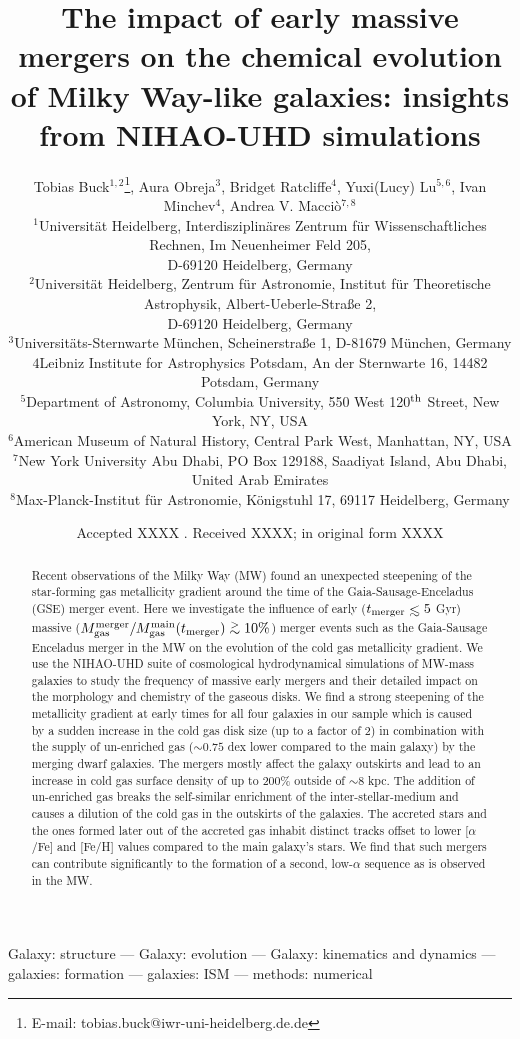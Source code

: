\documentclass[useAMS,usenatbib]{mnras}
\title[Early massive accretion events in MW-mass galaxies]{The impact of early massive mergers on the chemical evolution of Milky Way-like galaxies: insights from NIHAO-UHD simulations}
\author[T. Buck] {Tobias Buck$^{1,2}$\thanks{E-mail: tobias.buck@iwr-uni-heidelberg.de.de}, Aura Obreja$^{3}$, Bridget Ratcliffe$^{4}$, Yuxi(Lucy) Lu$^{5, 6}$, 
\newauthor Ivan Minchev$^{4}$, Andrea V. Macci\`o$^{7,8}$ \\  %
%
$^1$Universit\"at Heidelberg, Interdisziplin\"ares Zentrum f\"ur Wissenschaftliches Rechnen, Im Neuenheimer Feld 205, \\ D-69120 Heidelberg, Germany\\
$^2$Universit\"at Heidelberg, Zentrum f\"ur Astronomie, Institut f\"ur Theoretische Astrophysik, Albert-Ueberle-Straße 2, \\ D-69120 Heidelberg, Germany\\
$^3$Universit\"ats-Sternwarte M\"unchen, Scheinerstraße 1, D-81679 M\"unchen, Germany\\
${4}$Leibniz Institute for Astrophysics Potsdam, An der Sternwarte 16, 14482 Potsdam, Germany\\
$^{5}$Department of Astronomy, Columbia University, 550 West 120$^{\rm th}$ Street, New York, NY, USA\\
$^{6}$American Museum of Natural History, Central Park West, Manhattan, NY, USA\\
$^7$New York University Abu Dhabi, PO Box 129188, Saadiyat Island, Abu Dhabi, United Arab Emirates\\
$^8$Max-Planck-Institut f\"ur Astronomie, K\"onigstuhl 17, 69117 Heidelberg, Germany
}
\newcommand{\gtsima}{$\; \buildrel > \over \sim \;$}
\newcommand{\gsim}{\lower.5ex\hbox{\gtsima}}
\def\lesssim{\mathrel{\hbox{\rlap{\hbox{\lower4pt\hbox{$\sim$}}}\hbox{$<$}}}}
\begin{document}
\date{Accepted XXXX . Received XXXX; in original form XXXX}

\pagerange{\pageref{firstpage}--\pageref{lastpage}} 

\maketitle

\label{firstpage}


\begin{abstract}
Recent observations of the Milky Way (MW) found an unexpected steepening of the star-forming gas metallicity gradient around the time of the Gaia-Sausage-Enceladus (GSE) merger event.
Here we investigate the influence of early ($t_{\rm{merger}}\lesssim5$ Gyr) massive ($M_{\rm{gas}}^{\rm{merger}}/M_{\rm{gas}}^{\rm{main}}(t_{\rm{merger}})\gsim10\%$) merger events such as the Gaia-Sausage Enceladus merger in the MW on the evolution of the cold gas metallicity gradient. We use the NIHAO-UHD suite of cosmological hydrodynamical simulations of MW-mass galaxies to study the frequency of massive early mergers and their detailed impact on the morphology and chemistry of the gaseous disks. 
We find a strong steepening of the metallicity gradient at early times for all four galaxies in our sample which is caused by a sudden increase in the cold gas disk size (up to a factor of 2) in combination with the supply of un-enriched gas ($\sim0.75$ dex lower compared to the main galaxy) by the merging dwarf galaxies.
The mergers mostly affect the galaxy outskirts and lead to an increase in cold gas surface density of up to 200\% outside of $\sim8$ kpc. The addition of un-enriched gas breaks the self-similar enrichment of the inter-stellar-medium and causes a dilution of the cold gas in the outskirts of the galaxies. 
The accreted stars and the ones formed later out of the accreted gas inhabit distinct tracks offset to lower [$\alpha$/Fe] and [Fe/H] values compared to the main galaxy's stars. We find that such mergers can contribute significantly to the formation of a second, low-$\alpha$ sequence as is observed in the MW.
\end{abstract}

\noindent
\begin{keywords}

Galaxy: structure --- Galaxy: evolution --- Galaxy: kinematics and dynamics --- galaxies:  formation --- galaxies: ISM --- methods: numerical
 \end{keywords}
\end{document}
